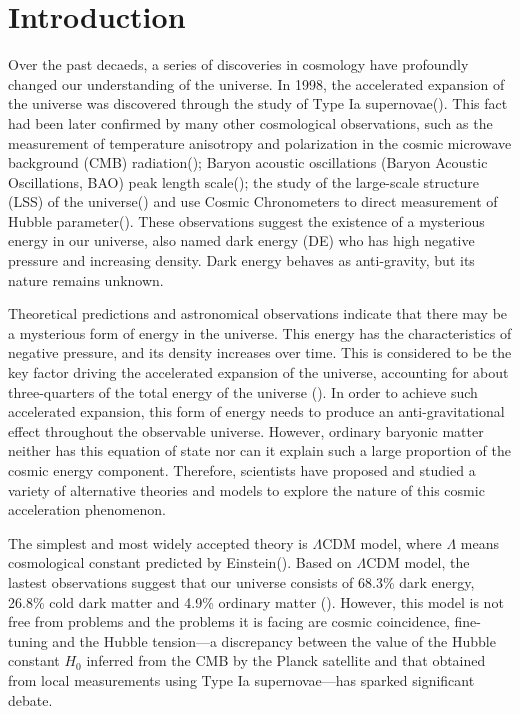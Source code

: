 \documentclass[linenumbers]{aastex631}
\begin{document}
\section{Introduction} \label{sec:intro}
Over the past decaeds, a series of discoveries in cosmology have profoundly changed our understanding of the universe. In 1998, the accelerated expansion of the universe was discovered through the study of Type Ia supernovae(\cite{perlmutter_discovery_1998,Riess_1998}). This fact had been later confirmed by many other cosmological observations, such as the measurement of temperature anisotropy and polarization in the cosmic microwave background (CMB) radiation(\cite{1992ApJ...396L...1S,2020Planck}); Baryon acoustic oscillations (Baryon Acoustic Oscillations, BAO) peak length scale(\cite{Eisenstein_2005,10.1111/j.1365-2966.2011.19592.x}); the study of the large-scale structure (LSS) of the universe(\cite{Dodelson_2002,Percival_2007}) and use Cosmic Chronometers to direct measurement of Hubble parameter(\cite{Daniel_Stern_2010,Moresco_2015}). These observations suggest the existence of a mysterious energy in our universe, also named dark energy (DE)  who has high negative pressure and increasing density. Dark energy behaves as anti-gravity, but its nature remains unknown.

Theoretical predictions and astronomical observations indicate that there may be a mysterious form of energy in the universe. This energy has the characteristics of negative pressure, and its density increases over time. This is considered to be the key factor driving the accelerated expansion of the universe, accounting for about three-quarters of the total energy of the universe (\cite{PhysRevD.37.3406,PhysRevD.63.103510,10.1143/PTP.106.929}). In order to achieve such accelerated expansion, this form of energy needs to produce an anti-gravitational effect throughout the observable universe. However, ordinary baryonic matter neither has this equation of state nor can it explain such a large proportion of the cosmic energy component. Therefore, scientists have proposed and studied a variety of alternative theories and models to explore the nature of this cosmic acceleration phenomenon.

The simplest and most widely accepted theory is $\Lambda \text{CDM}$ model, where $\Lambda$ means cosmological constant predicted by Einstein(\cite{Carroll_2001}).
Based on $\Lambda \text{CDM}$ model, the lastest observations suggest that our universe consists of 68.3\% dark energy, 26.8\% cold dark matter and 4.9\% ordinary matter (\cite{2020Planck}). However, this model is not free from problems and the problems it is facing are cosmic coincidence, fine-tuning and the Hubble tension—a discrepancy between the value of the Hubble constant $H_0$ inferred from the CMB by the Planck satellite and that obtained from local measurements using Type Ia supernovae—has sparked significant debate. 
\end{document}
